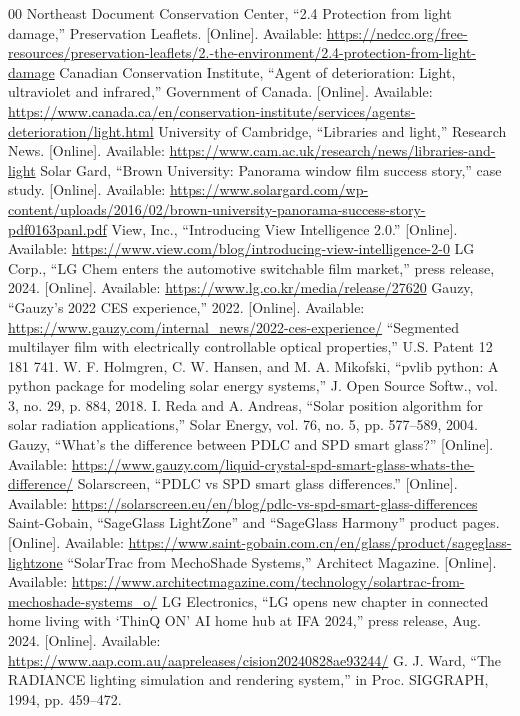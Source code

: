 \documentclass[conference]{IEEEtran}
\begin{document}
\begin{thebibliography}{00}
 Northeast Document Conservation Center, ``2.4 Protection from light damage,'' Preservation Leaflets. [Online]. Available: \url{https://nedcc.org/free-resources/preservation-leaflets/2.-the-environment/2.4-protection-from-light-damage}
 Canadian Conservation Institute, ``Agent of deterioration: Light, ultraviolet and infrared,'' Government of Canada. [Online]. Available: \url{https://www.canada.ca/en/conservation-institute/services/agents-deterioration/light.html}
 University of Cambridge, ``Libraries and light,'' Research News. [Online]. Available: \url{https://www.cam.ac.uk/research/news/libraries-and-light}
 Solar Gard, ``Brown University: Panorama window film success story,'' case study. [Online]. Available: \url{https://www.solargard.com/wp-content/uploads/2016/02/brown-university-panorama-success-story-pdf0163panl.pdf}
 View, Inc., ``Introducing View Intelligence 2.0.'' [Online]. Available: \url{https://www.view.com/blog/introducing-view-intelligence-2-0}
 LG Corp., ``LG Chem enters the automotive switchable film market,'' press release, 2024. [Online]. Available: \url{https://www.lg.co.kr/media/release/27620}
 Gauzy, ``Gauzy's 2022 CES experience,'' 2022. [Online]. Available: \url{https://www.gauzy.com/internal_news/2022-ces-experience/}
 ``Segmented multilayer film with electrically controllable optical properties,'' U.S. Patent 12 181 741.
 W. F. Holmgren, C. W. Hansen, and M. A. Mikofski, ``pvlib python: A python package for modeling solar energy systems,'' J. Open Source Softw., vol. 3, no. 29, p. 884, 2018.
 I. Reda and A. Andreas, ``Solar position algorithm for solar radiation applications,'' Solar Energy, vol. 76, no. 5, pp. 577--589, 2004.
 Gauzy, ``What's the difference between PDLC and SPD smart glass?'' [Online]. Available: \url{https://www.gauzy.com/liquid-crystal-spd-smart-glass-whats-the-difference/}
 Solarscreen, ``PDLC vs SPD smart glass differences.'' [Online]. Available: \url{https://solarscreen.eu/en/blog/pdlc-vs-spd-smart-glass-differences}
 Saint-Gobain, ``SageGlass LightZone'' and ``SageGlass Harmony'' product pages. [Online]. Available: \url{https://www.saint-gobain.com.cn/en/glass/product/sageglass-lightzone}
 ``SolarTrac from MechoShade Systems,'' Architect Magazine. [Online]. Available: \url{https://www.architectmagazine.com/technology/solartrac-from-mechoshade-systems_o/}
 LG Electronics, ``LG opens new chapter in connected home living with `ThinQ ON' AI home hub at IFA 2024,'' press release, Aug. 2024. [Online]. Available: \url{https://www.aap.com.au/aapreleases/cision20240828ae93244/}
 G. J. Ward, ``The RADIANCE lighting simulation and rendering system,'' in Proc. SIGGRAPH, 1994, pp. 459--472.
\end{thebibliography}
\end{document}
